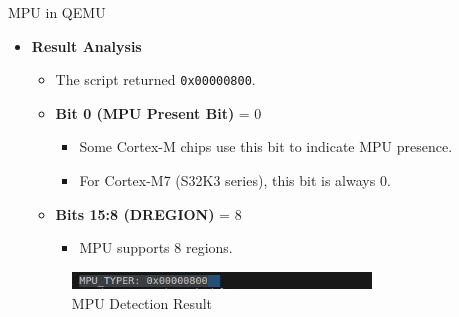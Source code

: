 \begin{frame}{MPU in QEMU}
    \begin{itemize}
        \item \textbf{Result Analysis}
        \begin{itemize}
            \item The script returned \texttt{0x00000800}.
            \item \textbf{Bit 0 (MPU Present Bit)} = 0 
            \begin{itemize}
                \item Some Cortex-M chips use this bit to indicate MPU presence.
                \item For Cortex-M7 (S32K3 series), this bit is always 0. 
            \end{itemize}
            \item \textbf{Bits 15:8 (DREGION)} = 8  
            \begin{itemize}
                \item MPU supports 8 regions.
            \end{itemize}
        \end{itemize}
        \begin{figure}[h]
            \centering
            \includegraphics[width=0.75\textwidth]{images/mpu_qemu_2.png}
            \caption{MPU Detection Result}
        \end{figure}
    \end{itemize}
\end{frame}
